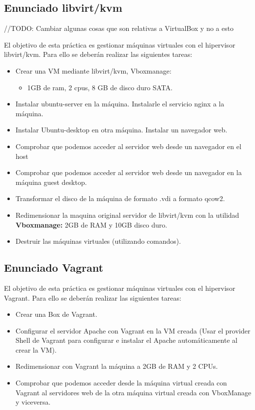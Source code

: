\subsection{Enunciado libvirt/kvm}
//TODO: Cambiar algunas cosas que son relativas a VirtualBox y no a esto
\begin{ejer}
    \par El objetivo de esta práctica es gestionar máquinas virtuales con el hipervisor libvirt/kvm. 
	Para ello se deberán realizar las siguientes tareas:
	\begin{itemize}
		\item Crear una VM mediante libvirt/kvm, Vboxmanage: 
		\begin{itemize}
			\item 1GB de ram, 2 cpus, 8 GB de disco duro SATA.
		\end{itemize}
		\item Instalar ubuntu-server en la máquina. Instalarle el servicio nginx a la máquina. 
		\item Instalar Ubuntu-desktop en otra máquina. Instalar un navegador web. 
		\item Comprobar que podemos acceder al servidor web desde un navegador en el host 
		\item Comprobar que podemos acceder al servidor web desde un navegador en la máquina guest desktop.
		\item Transformar el disco de la máquina de formato .vdi a formato qcow2. 
		\item Redimensionar la maquina original servidor de libvirt/kvm con la utilidad \textbf{Vboxmanage:} 2GB de RAM y 10GB disco duro. 
		\item Destruir las máquinas virtuales (utilizando comandos).
	\end{itemize}
\end{ejer}



\subsection{Enunciado Vagrant}
\begin{ejer}
    \par El objetivo de esta práctica es gestionar máquinas virtuales con el hipervisor Vagrant. 
	Para ello se deberán realizar las siguientes tareas:
	\begin{itemize}
		\item Crear una Box de Vagrant. 
		\item Configurar el servidor Apache con Vagrant en la VM creada (Usar el provider Shell de Vagrant para configurar e instalar el Apache automáticamente al crear la VM).
		\item Redimensionar con Vagrant la máquina a 2GB de RAM y 2 CPUs.
		\item Comprobar que podemos acceder desde la máquina virtual creada con Vagrant al servidores web de la otra máquina virtual creada con VboxManage y viceversa.
	\end{itemize}
\end{ejer}

